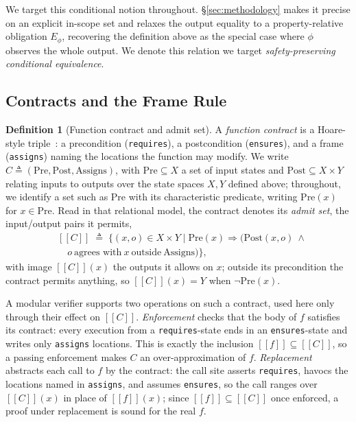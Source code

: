 \documentclass[conference]{IEEEtran}
\theoremstyle{definition}
\newtheorem{definition}{Definition}
\theoremstyle{remark}
\newcommand{\sem}[1]{[\![#1]\!]}
\begin{document}
We target this conditional notion throughout. \S\ref{sec:methodology}
makes it precise on an explicit in-scope set and relaxes the output
equality to a property-relative obligation $E_\phi$, recovering the
definition above as the special case where $\phi$ observes the whole
output. We denote this relation we target \textit{safety-preserving
conditional equivalence}.

\subsection{Contracts and the Frame Rule}\label{subsec:contracts}
\begin{definition}[Function contract and admit set]\label{def:contract}
  A \emph{function contract}
  is a Hoare-style
  triple~\cite{hoare1969axiomatic,meyer1992dbc}: a precondition
  (\texttt{requires}), a postcondition (\texttt{ensures}), and a frame
  (\texttt{assigns}) naming the locations the function may modify. We write
  $C\triangleq(\text{Pre},\text{Post},\text{Assigns})$, with
  $\text{Pre}\subseteq X$ a set of input states and $\text{Post}\subseteq
  X\times Y$ relating inputs to outputs over the state spaces $X,Y$ defined
  above; throughout, we identify a set such as $\text{Pre}$ with its
  characteristic predicate, writing $\text{Pre}(x)$ for $x\in\text{Pre}$.
  Read in that relational model, the contract denotes
  its \emph{admit set}, the input/output pairs it permits,
  \[
    \begin{aligned}
      &\sem{C}\;\triangleq\;\{(x,o)\in X\times Y \mid \text{Pre}(x)\Rightarrow
        (\text{Post}(x,o)\ \wedge{}\\
      &\quad o\ \text{agrees with}\ x\ \text{outside}\ \text{Assigns})\},
    \end{aligned}
  \]
  with image $\sem{C}(x)$ the outputs it allows on $x$; outside its
  precondition the contract permits anything, so $\sem{C}(x)=Y$ when
  $\neg\text{Pre}(x)$.
\end{definition}
A modular verifier supports two operations on such a contract, used here
only through their effect on $\sem{C}$.
\emph{Enforcement} checks that the body of $f$ satisfies its
contract: every execution from a \texttt{requires}-state ends in an
\texttt{ensures}-state and writes only \texttt{assigns} locations. This
is exactly the inclusion $\sem{f}\subseteq\sem{C}$, so a passing
enforcement makes $C$ an over-approximation of $f$.
\emph{Replacement} abstracts each call to $f$ by the contract: the
call site asserts \texttt{requires}, havocs the locations named in
\texttt{assigns}, and assumes \texttt{ensures}, so the call ranges over
$\sem{C}(x)$ in place of $\sem{f}(x)$; since $\sem{f}\subseteq\sem{C}$
once enforced, a proof under replacement is sound for the real $f$.
\end{document}
